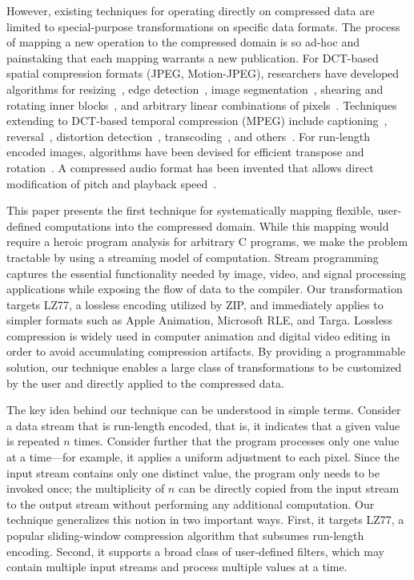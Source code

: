 However, existing techniques for operating directly on compressed data
are limited to special-purpose transformations on specific data
formats.  The process of mapping a new operation to the compressed
domain is so ad-hoc and painstaking that each mapping warrants a new
publication.  For DCT-based spatial compression formats (JPEG,
Motion-JPEG), researchers have developed algorithms for
resizing~\cite{dugad01,mukherjee02}, edge
detection~\cite{shen96b,shen96}, image segmentation~\cite{feng03},
shearing and rotating inner blocks~\cite{shen98}, and arbitrary linear
combinations of pixels~\cite{smith96b}.  Techniques extending to
DCT-based temporal compression (MPEG) include captioning~\cite{nang00},
reversal~\cite{vasudev98}, distortion detection~\cite{dorai00},
transcoding~\cite{smith98}, and others~\cite{wee02survey}.  For
run-length encoded images, algorithms have been devised for efficient
transpose and rotation~\cite{misra99,shoji95}.  A compressed audio
format has been invented that allows direct modification of pitch and
playback speed~\cite{levine98}.

\enlargethispage{0.2\baselineskip}
This paper presents the first technique for systematically mapping
flexible, user-defined computations into the compressed domain.  While
this mapping would require a heroic program analysis for arbitrary C
programs, we make the problem tractable by using a streaming model of
computation.  Stream programming captures the essential functionality
needed by image, video, and signal processing applications while
exposing the flow of data to the compiler.  Our transformation targets
LZ77, a lossless encoding utilized by ZIP, and immediately applies to
simpler formats such as Apple Animation, Microsoft RLE, and Targa.
Lossless compression is widely used in computer animation and digital
video editing in order to avoid accumulating compression artifacts.
By providing a programmable solution, our technique enables a large
class of transformations to be customized by the user and directly
applied to the compressed data.

The key idea behind our technique can be understood in simple terms.
Consider a data stream that is run-length encoded, that is, it
indicates that a given value is repeated $n$ times.  Consider further
that the program processes only one value at a time---for example, it
applies a uniform adjustment to each pixel.  Since the input stream
contains only one distinct value, the program only needs to be invoked
once; the multiplicity of $n$ can be directly copied from the input
stream to the output stream without performing any additional
computation.  Our technique generalizes this notion in two important
ways.  First, it targets LZ77, a popular sliding-window compression
algorithm that subsumes run-length encoding.  Second, it supports a
broad class of user-defined filters, which may contain multiple input
streams and process multiple values at a time.

